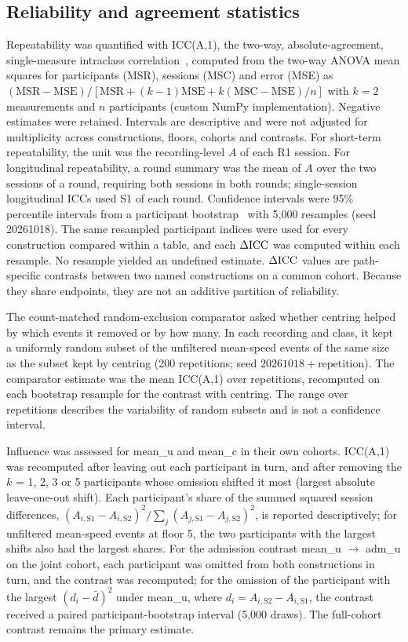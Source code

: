 \subsection{Reliability and agreement statistics}

Repeatability was quantified with ICC(A,1), the two-way, absolute-agreement, single-measure intraclass correlation~\citep{mcgraw1996,koo2016}, computed from the two-way ANOVA mean squares for participants (MSR), sessions (MSC) and error (MSE) as $(\mathrm{MSR}-\mathrm{MSE})/[\mathrm{MSR}+(k-1)\mathrm{MSE}+k(\mathrm{MSC}-\mathrm{MSE})/n]$ with $k = 2$ measurements and $n$ participants (custom NumPy implementation). Negative estimates were retained. Intervals are descriptive and were not adjusted for multiplicity across constructions, floors, cohorts and contrasts. For short-term repeatability, the unit was the recording-level $A$ of each R1 session. For longitudinal repeatability, a round summary was the mean of $A$ over the two sessions of a round, requiring both sessions in both rounds; single-session longitudinal ICCs used S1 of each round. Confidence intervals were 95\% percentile intervals from a participant bootstrap~\citep{field2007} with 5,000 resamples (seed 20261018). The same resampled participant indices were used for every construction compared within a table, and each $\Delta\mathrm{ICC}$ was computed within each resample. No resample yielded an undefined estimate. $\Delta\mathrm{ICC}$ values are path-specific contrasts between two named constructions on a common cohort. Because they share endpoints, they are not an additive partition of reliability.

The count-matched random-exclusion comparator asked whether centring helped by which events it removed or by how many. In each recording and class, it kept a uniformly random subset of the unfiltered mean-speed events of the same size as the subset kept by centring (200 repetitions; seed $20261018 + \text{repetition}$). The comparator estimate was the mean ICC(A,1) over repetitions, recomputed on each bootstrap resample for the contrast with centring. The range over repetitions describes the variability of random subsets and is not a confidence interval.

Influence was assessed for mean\_u and mean\_c in their own cohorts. ICC(A,1) was recomputed after leaving out each participant in turn, and after removing the $k$ = 1, 2, 3 or 5 participants whose omission shifted it most (largest absolute leave-one-out shift). Each participant's share of the summed squared session differences, $(A_{i,\mathrm{S1}} - A_{i,\mathrm{S2}})^2 / \sum_j (A_{j,\mathrm{S1}} - A_{j,\mathrm{S2}})^2$, is reported descriptively; for unfiltered mean-speed events at floor 5, the two participants with the largest shifts also had the largest shares. For the admission contrast mean\_u $\to$ adm\_u on the joint cohort, each participant was omitted from both constructions in turn, and the contrast was recomputed; for the omission of the participant with the largest $(d_i-\bar d)^2$ under mean\_u, where $d_i = A_{i,\mathrm{S2}} - A_{i,\mathrm{S1}}$, the contrast received a paired participant-bootstrap interval (5,000 draws). The full-cohort contrast remains the primary estimate.


